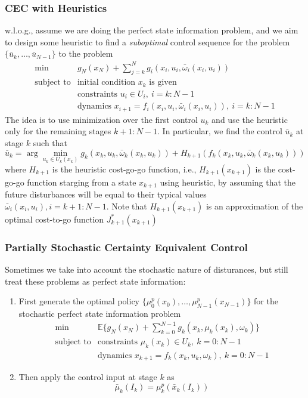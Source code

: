 \subsubsection{CEC with Heuristics}
w.l.o.g., assume we are doing the perfect state information problem, and we aim to design some heuristic to find a \emph{suboptimal} control sequence for the problem $\{\bar{u}_k,\dots,\bar{u}_{N-1}\}$ to the problem
\[
\begin{array}{ll}
\min&g_N(x_N)+\sum_{j=k}^Ng_i(x_i,u_i,\bar{\omega}_i(x_i,u_i))\\
\text{subject to}&\text{initial condition $x_k$ is given}\\
&\text{constraints }u_i\in U_i,\ i=k:N-1\\
&\text{dynamics } x_{i+1}=f_i(x_i,u_i,\bar{\omega}_i(x_i,u_i)),\ i=k:N-1
\end{array}
\]
The idea is to use minimization over the first control $u_k$ and use the heuristic only for the remaining stages $k+1:N-1$.
In particular, we find the control $\bar{u}_k$ at stage $k$ such that
\[
\bar{u}_k = \arg\min_{u_k\in U_k(x_k)}g_k(x_k,u_k,\bar{\omega}_k(x_k,u_k))+H_{k+1}(f_k(x_k,u_k,\bar{\omega}_k(x_k,u_k)))
\]
where $H_{k+1}$ is the heuristic cost-go-go function, i.e., $H_{k+1}(x_{k+1})$ is the cost-go-go function starging from a state $x_{k+1}$ using heuristic, by assuming that the future disturbances will be equal to their typical values $\bar{\omega}_i(x_i,u_i), i=k+1:N-1$.
Note that $H_{k+1}(x_{k+1})$ is an approximation of the optimal cost-to-go function $J^*_{k+1}(x_{k+1})$

\subsubsection{Partially Stochastic Certainty Equivalent Control}
Sometimes we take into account the stochastic nature of disturances, but still treat these problems as perfect state information:
\begin{enumerate}
\item
First generate the optimal policy $\{\mu_0^p(x_0),\dots,\mu_{N-1}^p(x_{N-1})\}$ for the stochastic perfect state information problem
\[
\begin{array}{ll}
\min&\mathbb{E}\Bigg\{
g_N(x_N)+\sum_{k=0}^{N-1}g_k(x_k,\mu_k(x_k),\omega_k)
\Bigg\}\\
\text{subject to}&\text{constraints }\mu_k(x_k)\in U_k,\ k=0:N-1\\
&\text{dynamics } x_{k+1}=f_k(x_k,u_k,\omega_k),\ k=0:N-1
\end{array}
\]
\item
Then apply the control input at stage $k$ as
\[
\bar{\mu}_k(I_k) = \mu_k^p(\bar{x}_k(I_k))
\]
\end{enumerate}


